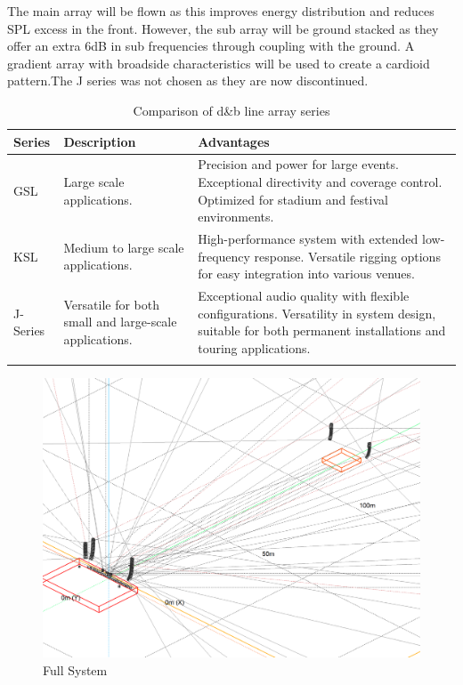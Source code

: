     The main array will be flown as this improves energy distribution and reduces SPL excess in the front. However, the sub array will be ground stacked as they offer an extra 6dB in sub frequencies through coupling with the ground. A gradient array with broadside characteristics will be used to create a cardioid pattern.The J series was not chosen as they are now discontinued.

    \begin{longtable}[H]{|l|p{7cm}|p{7cm}|}
        \hline
        Series & Description & Advantages \\ \hline
        \endfirsthead
        \endhead
        GSL & Large scale applications. & Precision and power for large events. Exceptional directivity and coverage control. Optimized for stadium and festival environments. \\ \hline
        KSL & Medium to large scale applications. & High-performance system with extended low-frequency response. Versatile rigging options for easy integration into various venues. \\ \hline
        J-Series & Versatile for both small and large-scale applications. & Exceptional audio quality with flexible configurations. Versatility in system design, suitable for both permanent installations and touring applications. \\ \hline
        \caption{Comparison of d\&b line array series}
        \label{tab:db_series_comparison}
    \end{longtable}

    \begin{figure}[H]
        \centering
        \includegraphics[width=1\linewidth]{Images/full_system.png}
        \caption{Full System}
        \label{fig:full_system}
    \end{figure}
    
